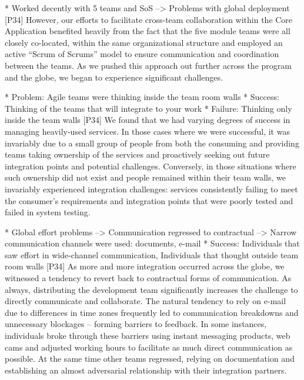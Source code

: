 \documentclass[preprint,authoryear,12pt]{elsarticle}
\begin{document}
* Worked decently with 5 teams and SoS --> Problems with global deployment
[P34]
However, our efforts to facilitate cross-team collaboration within the Core
Application benefited heavily from the fact that the five module teams were all
closely co-located, within the same organizational structure and employed an
active “Scrum of Scrums” model to ensure communication and coordination between
the teams.  As we pushed this approach out further across the program and the
globe, we began to experience significant challenges.


* Problem: Agile teams were thinking inside the team room walls
* Success: Thinking of the teams that will integrate to your work
* Failure: Thinking only inside the team walls
[P34]
We found that we had varying degrees of success in managing heavily-used
services.  In those cases where we were successful, it was invariably due to a
small group of people from both the consuming and providing teams taking
ownership of the services and proactively seeking out future integration points
and potential challenges.  Conversely, in those situations where such ownership
did not exist and people remained within their team walls, we invariably
experienced integration challenges: services consistently failing to meet the
consumer’s requirements and integration points that were poorly tested and
failed in system testing.


* Global effort problems --> Communication regressed to contractual --> Narrow communication channels were used: documents, e-mail
* Success: Individuals that saw effort in wide-channel communication, Individuals that thought outside team room walls
[P34]
As more and more integration occurred across the globe, we witnessed a tendency
to revert back to contractual forms of communication. As always, distributing
the development team significantly increases the challenge to directly
communicate and collaborate.  The natural tendency to rely on e-mail due to
differences in time zones frequently led to communication breakdowns and
unnecessary blockages – forming barriers to feedback. In some instances,
individuals broke through these barriers using instant messaging products, web
cams and adjusted working hours to facilitate as much direct communication as
possible.  At the same time other teams regressed, relying on documentation and
establishing an almost adversarial relationship with their integration partners.
\end{document}

